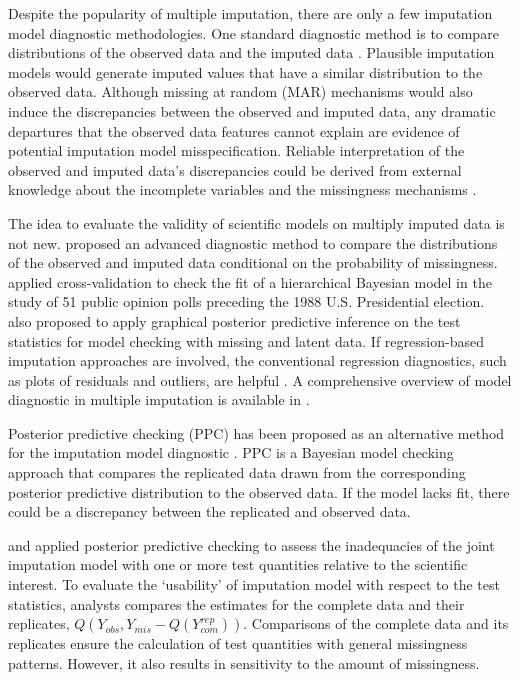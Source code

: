 	Despite the popularity of multiple imputation, there are only a few imputation model diagnostic methodologies. One standard diagnostic method is to compare distributions of the observed data and the imputed data \citep{Buuren2018, abayomi2008diagnostics}. Plausible imputation models would generate imputed values that have a similar distribution to the observed data. Although missing at random (MAR) mechanisms would also induce the discrepancies between the observed and imputed data, any dramatic departures that the observed data features cannot explain are evidence of potential imputation model misspecification. Reliable interpretation of the observed and imputed data's discrepancies could be derived from external knowledge about the incomplete variables and the missingness mechanisms \citep{abayomi2008diagnostics}. 
	
	The idea to evaluate the validity of scientific models on multiply imputed data is not new. \citet{bondarenko2016graphical} proposed an advanced diagnostic method to compare the distributions of the observed and imputed data conditional on the probability of missingness. \citet{gelman1998not} applied cross-validation to check the fit of a hierarchical Bayesian model in the study of 51 public opinion polls preceding the 1988 U.S. Presidential election. \citet{gelman2005multiple} also proposed to apply graphical posterior predictive inference on the test statistics for model checking with missing and latent data. If regression-based imputation approaches are involved, the conventional regression diagnostics, such as plots of residuals and outliers, are helpful \citep{white2011multiple}. A comprehensive overview of model diagnostic in multiple imputation is available in \citet{nguyen2017model}.
	
	Posterior predictive checking (PPC) has been proposed as an alternative method for the imputation model diagnostic \citep{gelman2005multiple, he2012diagnosing, nguyen2015posterior}. PPC is a Bayesian model checking approach that compares the replicated data drawn from the corresponding posterior predictive distribution to the observed data. If the model lacks fit, there could be a discrepancy between the replicated and observed data. 
	
	\citet{he2012diagnosing} and \citet{nguyen2015posterior} applied posterior predictive checking to assess the inadequacies of the joint imputation model with one or more test quantities relative to the scientific interest. To evaluate the `usability' of imputation model with respect to the test statistics, analysts compares the estimates for the complete data and their replicates, $Q(Y_{obs}, Y_{mis} - Q(Y^{rep}_{com}))$. Comparisons of the complete data and its replicates ensure the calculation of test quantities with general missingness patterns. However, it also results in sensitivity to the amount of missingness.    
	
